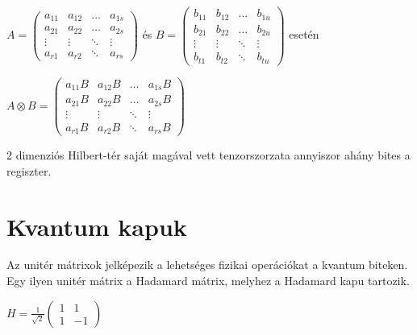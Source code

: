 \begin{center}
  $A = \begin{pmatrix}
      a_{11} & a_{12} & \dots  & a_{1s} \\
      a_{21} & a_{22} & \dots  & a_{2s} \\
      \vdots & \vdots & \ddots & \vdots \\
      a_{r1} & a_{r2} & \ddots & a_{rs}
    \end{pmatrix}
  $
  és
  $B = \begin{pmatrix}
      b_{11} & b_{12} & \dots  & b_{1u} \\
      b_{21} & b_{22} & \dots  & b_{2u} \\
      \vdots & \vdots & \ddots & \vdots \\
      b_{t1} & b_{t2} & \ddots & b_{tu}
    \end{pmatrix}
  $ esetén
\end{center}

\begin{center}
  $A \otimes B = \begin{pmatrix}
      a_{11}B & a_{12}B & \dots  & a_{1s}B \\
      a_{21}B & a_{22}B & \dots  & a_{2s}B \\
      \vdots  & \vdots  & \ddots & \vdots  \\
      a_{r1}B & a_{r2}B & \ddots & a_{rs}B
    \end{pmatrix}
  $
\end{center}



2 dimenziós Hilbert-tér saját magával vett tenzorszorzata annyiszor ahány bites a regiszter.

\section{Kvantum kapuk}

Az unitér mátrixok jelképezik a lehetséges fizikai operációkat a kvantum biteken.
Egy ilyen unitér mátrix a Hadamard mátrix, melyhez a Hadamard kapu tartozik.


\begin{center}
  $H = \frac{1}{\sqrt{2}}\begin{pmatrix}
      1 & 1  \\
      1 & -1
    \end{pmatrix}$
\end{center}

